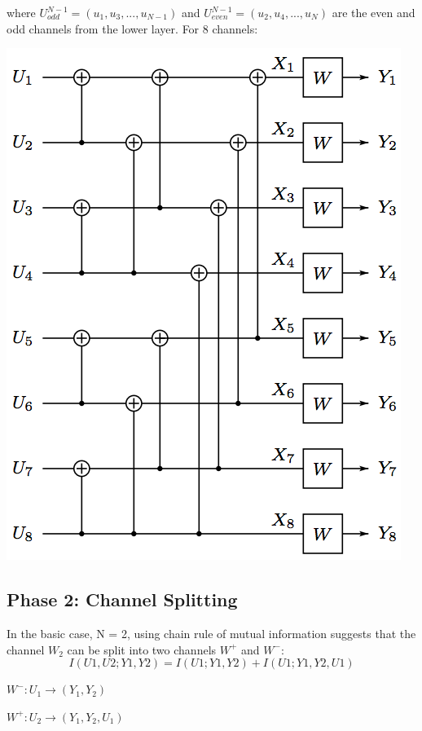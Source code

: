 \documentclass[10pt,a4paper,landscape]{article}
\begin{document}
\begin{multicols*}{4}
where $U_{odd}^{N−1} = (u_1, u_3, ..., u_{N−1})$ and $U_{even}^{N−1} = (u_2, u_4, ..., u_N )$ are the even and odd channels from the lower layer. For 8 channels:

\begin{colfig}
	\centering
	\includegraphics[width=\linewidth]{polar-eight-inputs.png}
\end{colfig}

\subsection{Phase 2: Channel Splitting}

In the basic case, N = 2, using chain rule of mutual information suggests that the channel $W_2$ can be split into two channels $W^+$ and $W^-$:
$$I(U1, U2; Y1, Y2) = I(U1; Y1, Y2) + I(U1; Y1, Y2, U1)$$

$W^- :U_1 \rightarrow (Y_1, Y_2)$

$W^+ :U_2 \rightarrow (Y_1, Y_2, U_1)$


\end{multicols*}
\end{document}
